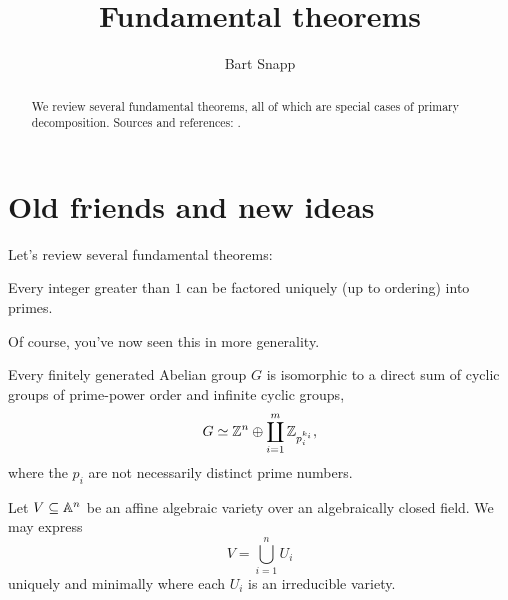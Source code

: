 \documentclass{ximera}
\author{Bart Snapp}
\title{Fundamental theorems}
\begin{document}
\begin{abstract}
  We review several fundamental theorems, all of which are special
  cases of primary decomposition. Sources and references:
  \cite{dE1995,hS2003}.
\end{abstract}
\maketitle

\section{Old friends and new ideas}

Let's review several fundamental theorems:

\begin{theorem}
  Every integer greater than $1$ can be factored uniquely (up to
  ordering) into primes.
\end{theorem}

Of course, you've now seen this in more generality.


\begin{theorem}
  Every finitely generated Abelian group $G$ is isomorphic to a
  direct sum of cyclic groups of prime-power order and infinite cyclic
  groups,
  \[
  G \simeq \mathbb Z^n \oplus \coprod_{i=1}^{m} \mathbb Z_{p_i^{k_i}},
  \]
  where the $p_i$ are not necessarily distinct prime numbers.
\end{theorem}


\begin{theorem}
  Let $V\subseteq\mathbb A^n$ be an affine algebraic variety over an
  algebraically closed field. We may express
  \[
  V = \bigcup_{i=1}^n U_i
  \]
  uniquely and minimally where each $U_i$ is an irreducible variety.
\end{theorem}
\end{document}
